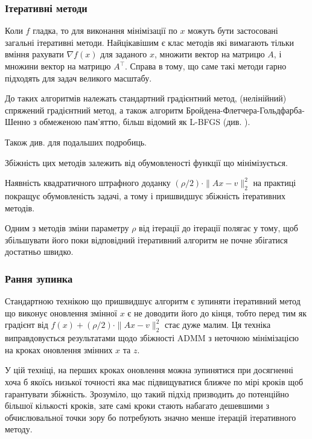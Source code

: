 \subsubsection{Ітеративні методи}

Коли $f$ гладка, то для виконання мінімізації по $x$ можуть бути застосовані загальні ітеративні методи. Найцікавішим є клас методів які вимагають тільки вміння рахувати $\nabla f(x)$ для заданого $x$, множити вектор на матрицю $A$, і множини вектор на матрицю $A^\intercal$. Справа в тому, що саме такі методи гарно підходять для задач великого масштабу.

\begin{example}
    До таких алгоритмів належать стандартний градієнтний метод, (нелінійний) спряжений градієнтний метод, а також алгоритм Бройдена-Флетчера-Гольдфарба-Шенно з обмеженою пам'яттю, більш відомий як L-BFGS (див. \cite{113, 26}).
\end{example}

Також див. \cite{135} для подальших подробиць. \medskip

Збіжність цих методів залежить від обумовленості функції що мінімізується. 

\begin{remark}
    Наявність квадратичного штрафного доданку $(\rho / 2) \cdot \|A x - v\|_2^2$ на практиці покращує обумовленість задачі, а тому і пришвидшує збіжність ітеративних методів.
\end{remark}

\begin{remark}
    Одним з методів зміни параметру $\rho$ від ітерації до ітерації полягає у тому, щоб збільшувати його поки відповідний ітеративний алгоритм не почне збігатися достатньо швидко.
\end{remark}

\subsubsection{Рання зупинка}

Стандартною технікою що пришвидшує алгоритм є зупиняти ітеративний метод що виконує оновлення змінної $x$ є не доводити його до кінця, тобто перед тим як градієнт від $f(x) + (\rho / 2) \cdot \|A x - v\|_2^2$ стає дуже малим. Ця техніка виправдовується результатами щодо збіжності ADMM з неточною  мінімізацією на кроках оновлення змінних $x$ та $z$. \medskip

У цій техніці, на перших кроках оновлення можна зупинятися при досягненні хоча б якоїсь низької точності яка має підвищуватися ближче по мірі кроків щоб гарантувати збіжність. Зрозуміло, що такий підхід призводить до потенційно більшої кількості кроків, зате самі кроки стають набагато дешевшими з обчислювальної точки зору бо потребують значно менше ітерацій ітеративного методу.

